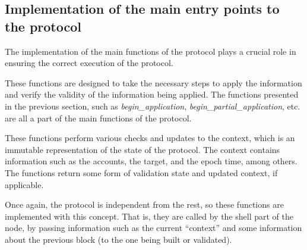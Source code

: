 \subsection*{Implementation of the main entry points to the protocol}

The implementation of the main functions of the protocol plays a crucial role in ensuring the correct execution of the protocol.

These functions are designed to take the necessary steps to apply the information and verify the validity of the information being applied. The functions presented in the previous section, such as \emph{begin\_application}, \emph{begin\_partial\_application}, etc. are all a part of the main functions of the protocol.

These functions perform various checks and updates to the context, which is an immutable representation of the state of the protocol.
The context contains information such as the accounts, the target, and the epoch time, among others. The functions return some form of validation state and updated context, if applicable.

Once again, the protocol is independent from the rest, so these functions are implemented with this concept. 
That is, they are called by the shell part of the node, by passing information such as the current ``context'' and some information about the previous block (to the one being built or validated).



